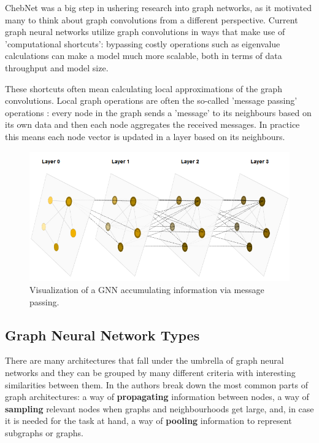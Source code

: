 	ChebNet was a big step in ushering research into graph networks, as it motivated many to think about graph convolutions from a different perspective. Current graph neural networks utilize graph convolutions in ways that make use of 'computational shortcuts': bypassing costly operations such as eigenvalue calculations can make a model much more scalable, both in terms of data throughput and model size.
	
	These shortcuts often mean calculating local approximations of the graph convolutions. Local graph operations are often the so-called 'message passing' operations \cite{gilmer2020message}: every node in the graph sends a 'message' to its neighbours based on its own data and then each node aggregates the received messages. In practice this means each node vector is updated in a layer based on its neighbours.
	
	\begin{figure}[!h]
		\centering
		\includegraphics[width=\textwidth]{figures/gnn.png}
		\caption{Visualization of a GNN accumulating information via message passing. \cite{sanchez-lengeling2021a}}
	\end{figure}
		
	\subsection{Graph Neural Network Types}
	
	There are many architectures that fall under the umbrella of graph neural networks and they can be grouped by many different criteria with interesting similarities between them. In \cite{gnn_review} the authors break down the most common parts of graph architectures: a way of \textbf{propagating} information between nodes, a way of \textbf{sampling} relevant nodes when graphs and neighbourhoods get large, and, in case it is needed for the task at hand, a way of \textbf{pooling} information to represent subgraphs or graphs.
	
